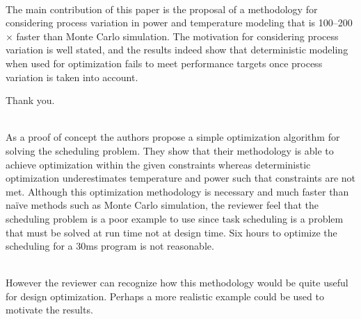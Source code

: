 \begin{reviewer}
\\
The main contribution of this paper is the proposal of a methodology for
considering process variation in power and temperature modeling that is
100--200$\times$ faster than Monte Carlo simulation. The motivation for
considering process variation is well stated, and the results indeed show that
deterministic modeling when used for optimization fails to meet performance
targets once process variation is taken into account.
\end{reviewer}

\begin{authors}
Thank you.
\end{authors}

\begin{reviewer}
\\
As a proof of concept the authors propose a simple optimization algorithm for
solving the scheduling problem. They show that their methodology is able to
achieve optimization within the given constraints whereas deterministic
optimization underestimates temperature and power such that constraints are not
met. Although this optimization methodology is necessary and much faster than
na\"{i}ve methods such as Monte Carlo simulation, the reviewer feel that the
scheduling problem is a poor example to use since task scheduling is a problem
that must be solved at run time not at design time. Six hours to optimize the
scheduling for a 30ms program is not reasonable.
\end{reviewer}

\begin{authors}
\begin{actions}
\end{actions}
\end{authors}

\begin{reviewer}
\\
However the reviewer can recognize how this methodology would be quite useful
for design optimization. Perhaps a more realistic example could be used to
motivate the results.
\end{reviewer}

\begin{authors}
\begin{actions}
\end{actions}
\end{authors}


